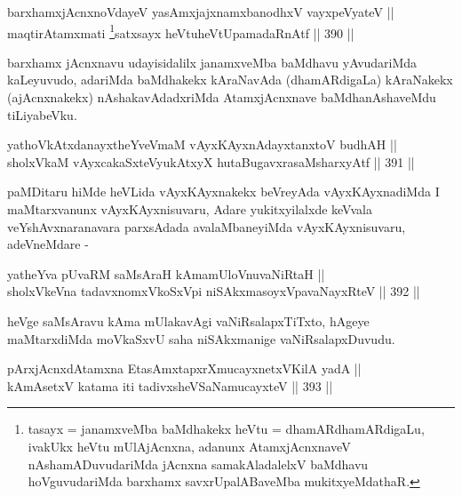 
\begin{shl}
barxhamxjAcnxnoVdayeV yasAmxjajxnamxbanodhxV vayxpeVyateV ||  \\
maqtirAtamxmati \footnote{tasayx = janamxveMba baMdhakekx heVtu = dhamARdhamARdigaLu, ivakUkx heVtu mUlAjAcnxna, adanunx AtamxjAcnxnaveV nAshamADuvudariMda jAcnxna samakAladalelxV baMdhavu hoVguvudariMda barxhamx savxrUpalABaveMba mukitxyeMdathaR.}satxsayx heVtuheVtUpamadaRnAtf \hfill || 390 ||  
\end{shl}


\begin{artha}
barxhamx jAcnxnavu udayisidalilx janamxveMba baMdhavu yAvudariMda
kaLeyuvudo, adariMda baMdhakekx kAraNavAda (dhamARdigaLa) kAraNakekx
(ajAcnxnakekx) nAshakavAdadxriMda AtamxjAcnxnave baMdhanAshaveMdu
tiLiyabeVku.
\end{artha}


\begin{shl}
yathoVkAtxdanayxtheYveVmaM vAyxKAyxnAdayxtanxtoV budhAH ||  \\
sholxVkaM vAyxcakaSxteV\s yukAtxyX hutaBugavxrasaMsharxyAtf \hfill || 391 ||  
\end{shl}

\begin{artha}
paMDitaru hiMde heVLida vAyxKAyxnakekx beVreyAda vAyxKAyxnadiMda I
maMtarxvanunx vAyxKAyxnisuvaru, Adare yukitxyilalxde keVvala
veYshAvxnaranavara parxsAdada avalaMbaneyiMda vAyxKAyxnisuvaru, adeVneMdare  -
\end{artha}

\begin{shl}
yatheYva pUvaRM saMsAraH kAmamUloV\s nuvaNiRtaH || \\
sholxVkeVna tadavxnomxVkoSxV\s pi niSAkxmasoyxVpavaNayxRteV \hfill || 392 ||  
\end{shl}

\begin{artha}
heVge saMsAravu kAma mUlakavAgi vaNiRsalapxTiTxto, hAgeye maMtarxdiMda
moVkaSxvU saha niSAkxmanige vaNiRsalapxDuvudu.
\end{artha}


\begin{shl}
pArxjAcnxdAtamxna EtasAmxtapxrXmucayxnetxV\s KilA yadA || \\
kAmAsetxV katama iti tadivxsheVSaNamucayxteV \hfill || 393 ||  
\end{shl}

